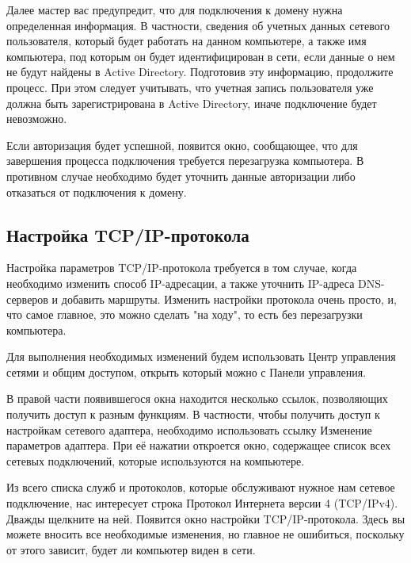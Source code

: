 Далее мастер вас предупредит, что для подключения к домену нужна определенная информация. В частности, сведения об учетных данных сетевого пользователя, который будет работать на данном компьютере, а также имя компьютера, под которым он будет идентифицирован в сети, если данные о нем не будут найдены в Active Directory. Подготовив эту информацию, продолжите процесс. При этом следует учитывать, что учетная запись пользователя уже должна быть зарегистрирована в Active Directory, иначе подключение будет невозможно.\par\bigskip

Если авторизация будет успешной, появится окно, сообщающее, что для завершения процесса подключения требуется перезагрузка компьютера. В противном случае необходимо будет уточнить данные авторизации либо отказаться от подключения к домену.\par\bigskip

\subsection{Настройка TCP/IP-протокола}

Настройка параметров TCP/IP-протокола требуется в том случае, когда необходимо изменить способ IP-адресации, а также уточнить IP-адреса DNS-серверов и добавить маршруты. Изменить настройки протокола очень просто, и, что самое главное, это можно сделать "на ходу", то есть без перезагрузки компьютера.\par\bigskip

Для выполнения необходимых изменений будем использовать Центр управления сетями и общим доступом, открыть который можно с Панели управления.\par\bigskip

В правой части появившегося окна находится несколько ссылок, позволяющих получить доступ к разным функциям. В частности, чтобы получить доступ к настройкам сетевого адаптера, необходимо использовать ссылку Изменение параметров адаптера. При её нажатии откроется окно, содержащее список всех сетевых подключений, которые используются на компьютере.\par\bigskip

Из всего списка служб и протоколов, которые обслуживают нужное нам сетевое подключение, нас интересует строка Протокол Интернета версии 4 (TCP/IPv4). Дважды щелкните на ней. Появится окно настройки TCP/IP-протокола. Здесь вы можете вносить все необходимые изменения, но главное не ошибиться, поскольку от этого зависит, будет ли компьютер виден в сети.